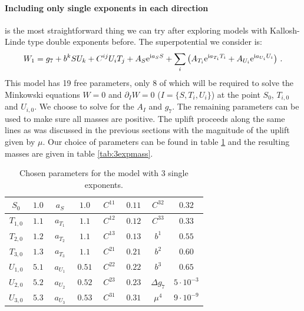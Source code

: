 \documentclass[a4paper,12pt,twoside,openright]{report}
\newcommand{\be}{\begin{equation}}
\newcommand{\ee}{\end{equation}}
\def\rmi{{\rm i}}
\def\rme{{\rm e}}
\begin{document}
\paragraph{Including only single exponents in each direction} is the most straightforward thing we can try after exploring models with Kallosh-Linde type double exponents before. The superpotential we consider is:
\be 
W_1 = g_7 + b^k S U_k + C^{ij} U_i T_j + A_S \rme^{\rmi a_S S} + \sum_i \left( A_{T_i} \rme^{\rmi a_{T_i}T_i} + A_{U_i} \rme^{\rmi a_{U_i}U_i} \right)\,.
\ee
This model has 19 free parameters, only 8 of which will be required to solve the Minkowski equations $W = 0$ and $\partial_I W = 0$ ($I = \{S, T_i, U_i \}$) at the point $S_0$, $T_{i,0}$ and $U_{i,0}$. We choose to solve for the $A_I$ and $g_7$. The remaining parameters can be used to make sure all masses are positive. The uplift proceeds along the same lines as was discussed in the previous sections with the magnitude of the uplift given by $\mu$. Our choice of parameters can be found in table \ref{tab:3exppara} and the resulting masses are given in table \ref{tab:3expmass}.
\begin{table}[htb]
\center
\begin{tabular}{|c|c||c|c||c|c||c|c|}\hline
 $\,S_0\,$     & $1.0$   & $\,a_S\,$ & $\;1.0\,$ &$\,C^{11}\,$ & $\,0.11\,$ &  $\,C^{32}\,$ & $\,0.32\,$\\\hline
 $T_{1,0}$ & $\,1.1\,$ & $\,a_{T_1}\,$ & $\;1.1\,$ & $C^{12}$ & $0.12$ & $C^{33}$ & $0.33$ \\\hline
 $T_{2,0}$ & $1.2$ & $\,a_{T_2}\,$ & $\;1.1\,$ & $C^{13}$ & $0.13$ & $b^1$     & $0.55$\\\hline
 $T_{3,0}$ & $1.3$ & $\,a_{T_3}\,$ & $\;1.1\,$ & $C^{21}$ & $0.21$ & $b^2$     & $0.60$  \\\hline
 $U_{1,0}$ & $5.1$ & $\,a_{U_1}\,$ & $\;0.51\,$ & $C^{22}$ & $0.22$ & $b^3$     & $0.65$ \\\hline
 $U_{2,0}$ & $5.2$ & $\,a_{U_2}\,$ & $\;0.52\,$ & $C^{23}$ & $0.23$ & $\Delta g_7$ & $5 \cdot 10^{-3} $ \\\hline
 $U_{3,0}$ & $5.3$ & $\,a_{U_3}\,$ & $\;0.53\,$ & $C^{31}$ & $0.31$ & $\mu^4$ & $ 9 \cdot 10^{-9} $ \\\hline
\end{tabular}
\caption{Chosen parameters for the model with 3 single exponents.}
\label{tab:3exppara}
\end{table}
\end{document}
